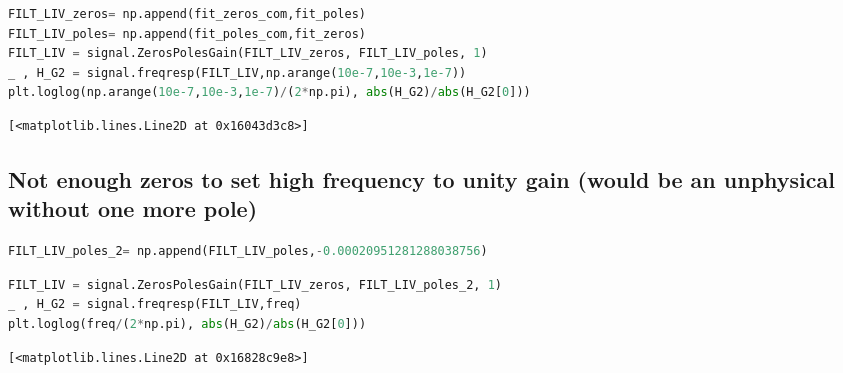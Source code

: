 \begin{spacing}{1} \begin{lstlisting}[language=Python]
FILT_LIV_zeros= np.append(fit_zeros_com,fit_poles)
FILT_LIV_poles= np.append(fit_poles_com,fit_zeros)
FILT_LIV = signal.ZerosPolesGain(FILT_LIV_zeros, FILT_LIV_poles, 1)
_ , H_G2 = signal.freqresp(FILT_LIV,np.arange(10e-7,10e-3,1e-7))
plt.loglog(np.arange(10e-7,10e-3,1e-7)/(2*np.pi), abs(H_G2)/abs(H_G2[0]))
\end{lstlisting} \end{spacing}

\begin{spacing}{1} \begin{lstlisting}
[<matplotlib.lines.Line2D at 0x16043d3c8>]
\end{lstlisting} \end{spacing}


\hypertarget{not-enough-zeros-to-set-high-frequency-to-unity-gain-would-be-an-unphysical-without-one-more-pole}{%
\subsection{Not enough zeros to set high frequency to unity gain (would
be an unphysical without one more
pole)}\label{not-enough-zeros-to-set-high-frequency-to-unity-gain-would-be-an-unphysical-without-one-more-pole}}

\begin{spacing}{1} \begin{lstlisting}[language=Python]
FILT_LIV_poles_2= np.append(FILT_LIV_poles,-0.00020951281288038756)
\end{lstlisting} \end{spacing}

\begin{spacing}{1} \begin{lstlisting}[language=Python]
FILT_LIV = signal.ZerosPolesGain(FILT_LIV_zeros, FILT_LIV_poles_2, 1)
_ , H_G2 = signal.freqresp(FILT_LIV,freq)
plt.loglog(freq/(2*np.pi), abs(H_G2)/abs(H_G2[0]))
\end{lstlisting} \end{spacing}

\begin{spacing}{1} \begin{lstlisting}
[<matplotlib.lines.Line2D at 0x16828c9e8>]
\end{lstlisting} \end{spacing}

